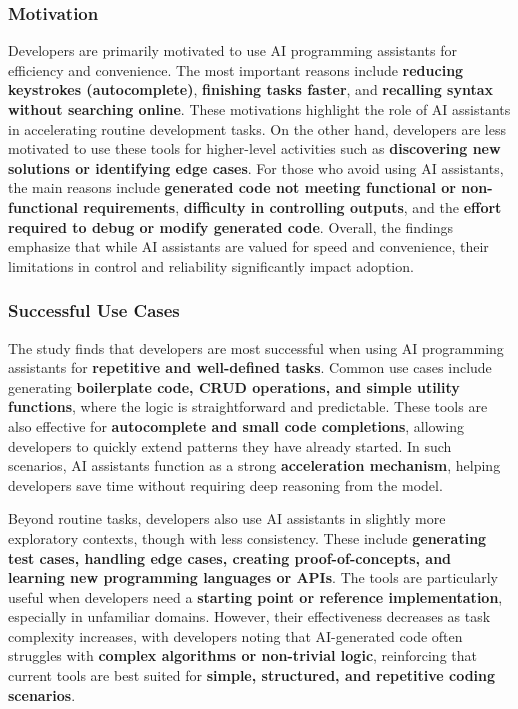 \subsubsection{Motivation}
Developers are primarily motivated to use AI programming assistants for efficiency and convenience. The most important reasons include \textbf{reducing keystrokes (autocomplete)}, \textbf{finishing tasks faster}, and \textbf{recalling syntax without searching online}. These motivations highlight the role of AI assistants in accelerating routine development tasks. On the other hand, developers are less motivated to use these tools for higher-level activities such as \textbf{discovering new solutions or identifying edge cases}. For those who avoid using AI assistants, the main reasons include \textbf{generated code not meeting functional or non-functional requirements}, \textbf{difficulty in controlling outputs}, and the \textbf{effort required to debug or modify generated code}. Overall, the findings emphasize that while AI assistants are valued for speed and convenience, their limitations in control and reliability significantly impact adoption.

\subsubsection{Successful Use Cases}
The study finds that developers are most successful when using AI programming assistants for \textbf{repetitive and well-defined tasks}. Common use cases include generating \textbf{boilerplate code, CRUD operations, and simple utility functions}, where the logic is straightforward and predictable. These tools are also effective for \textbf{autocomplete and small code completions}, allowing developers to quickly extend patterns they have already started. In such scenarios, AI assistants function as a strong \textbf{acceleration mechanism}, helping developers save time without requiring deep reasoning from the model.

Beyond routine tasks, developers also use AI assistants in slightly more exploratory contexts, though with less consistency. These include \textbf{generating test cases, handling edge cases, creating proof-of-concepts, and learning new programming languages or APIs}. The tools are particularly useful when developers need a \textbf{starting point or reference implementation}, especially in unfamiliar domains. However, their effectiveness decreases as task complexity increases, with developers noting that AI-generated code often struggles with \textbf{complex algorithms or non-trivial logic}, reinforcing that current tools are best suited for \textbf{simple, structured, and repetitive coding scenarios}.

